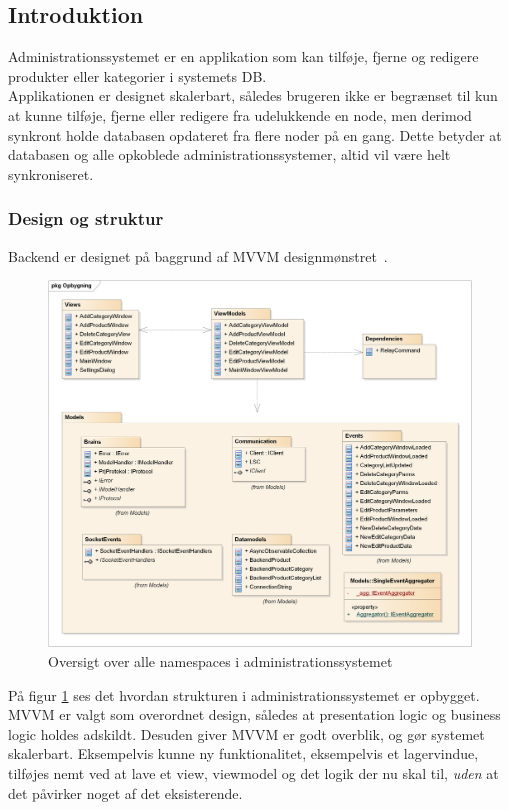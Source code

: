 \subsection{Introduktion}


Administrationssystemet er en applikation som kan tilføje, fjerne og redigere produkter eller kategorier i  systemets \gls{DB}.\\
Applikationen er designet skalerbart, således brugeren ikke er begrænset til kun at kunne tilføje, fjerne eller redigere fra udelukkende en node, men derimod synkront holde databasen opdateret fra flere noder på en gang. Dette betyder at databasen og alle opkoblede administrationssystemer, altid vil være helt synkroniseret.

\subsubsection{Design og struktur}
Backend er designet på baggrund af MVVM designmønstret~\cite{MVVM}. 
\begin{figure}[!h]
    \centering
    \includegraphics[width=1\textwidth]{Systemdesign/backend/Images/Opbygning.png}
    \caption{Oversigt over alle namespaces i administrationssystemet}
    \label{fig:oversigtAs}
\end{figure}

På figur \ref{fig:oversigtAs} ses det hvordan strukturen i administrationssystemet er opbygget. MVVM er valgt som overordnet design, således at presentation logic og business logic holdes adskildt. Desuden giver MVVM er godt overblik, og gør systemet skalerbart. Eksempelvis kunne ny funktionalitet, eksempelvis et lagervindue, tilføjes nemt ved at lave et view, viewmodel og det logik der nu skal til, \textit{uden} at det påvirker noget af det eksisterende.\\\\

